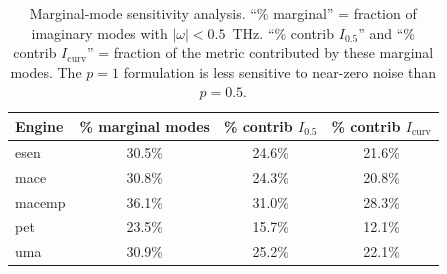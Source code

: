 \begin{table}[htbp]
\centering
\caption{Marginal-mode sensitivity analysis. ``\% marginal'' = fraction of imaginary modes with $|\omega|<0.5$~THz. ``\% contrib $I_{0.5}$'' and ``\% contrib $I_\mathrm{curv}$'' = fraction of the metric contributed by these marginal modes. The $p=1$ formulation is less sensitive to near-zero noise than $p=0.5$.}
\label{tab:si_marginal}
\begin{tabular}{lccc}
\toprule
Engine & \% marginal modes & \% contrib $I_{0.5}$ & \% contrib $I_\mathrm{curv}$ \\
\midrule
esen & 30.5\% & 24.6\% & 21.6\% \\
mace & 30.8\% & 24.3\% & 20.8\% \\
macemp & 36.1\% & 31.0\% & 28.3\% \\
pet & 23.5\% & 15.7\% & 12.1\% \\
uma & 30.9\% & 25.2\% & 22.1\% \\
\bottomrule
\end{tabular}
\end{table}